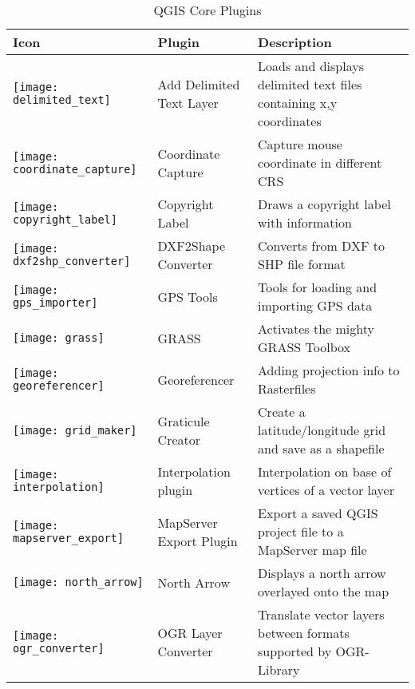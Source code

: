 \begin{minipage}{\textwidth}
\begin{table}[H]
\centering
\caption{QGIS Core Plugins}\label{tab:core_plugins}\medskip
\small
 \begin{tabular}{|l|l|p{4in}|}
\hline \textbf{Icon} & \textbf{Plugin} & \textbf{Description}\\
\hline
\texttt{[image: delimited\_text]}
 & Add Delimited Text Layer \index{plugins!delimited text} & Loads and displays delimited text files containing x,y coordinates\\
\hline
\texttt{[image: coordinate\_capture]}
 & Coordinate Capture \index{plugins!coordinate capture}& Capture mouse coordinate in different CRS\\
\hline 
\texttt{[image: copyright\_label]}
 & Copyright Label \index{plugins!copyright}& Draws a copyright label with information\\
\hline 
\texttt{[image: dxf2shp\_converter]}
 & DXF2Shape Converter \index{plugins!DXF2Shape}& Converts from DXF to SHP file format\\
\hline
\texttt{[image: gps\_importer]}
 & GPS Tools \index{plugins!gps}& Tools for loading and importing GPS data\\
\hline
\texttt{[image: grass]}
 & GRASS \index{plugin!grass toolbox} & Activates the mighty GRASS Toolbox\\
\hline
\texttt{[image: georeferencer]}
 & Georeferencer \index{plugin!georeferencer} & Adding projection info to Rasterfiles\\
\hline
\texttt{[image: grid\_maker]}
 & Graticule Creator \index{plugins!graticule}& Create a latitude/longitude grid and save as a shapefile\\
\hline
\texttt{[image: interpolation]}
& Interpolation plugin \index{plugins!Interpolation}& Interpolation on base of vertices of a vector layer\\
\hline
\texttt{[image: mapserver\_export]}
& MapServer Export Plugin \index{plugins!MapServer Export}& Export a saved QGIS project file to a MapServer map file \\
\hline
\texttt{[image: north\_arrow]}
& North Arrow \index{plugins!north arrow}& Displays a north arrow overlayed onto the map\\
\hline
\texttt{[image: ogr\_converter]}
 & OGR Layer Converter \index{plugins!OGR converter} & Translate vector layers between formats supported by OGR-Library\\

\end{tabular}
\end{table}
\end{minipage}

